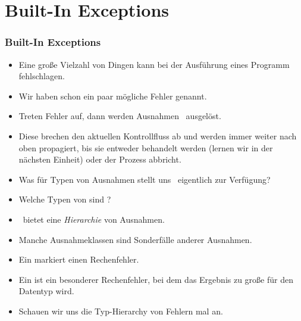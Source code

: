 \documentclass[aspectratio=169,mathserif,notheorems]{beamer}%
\begin{document}
\section{Built-In Exceptions}%
%
\begin{frame}%
\frametitle{Built-In Exceptions}%
\begin{itemize}%
\item Eine große Vielzahl von Dingen kann bei der Ausführung eines Programm fehlschlagen.%
%
\item<2-> Wir haben schon ein paar mögliche Fehler genannt.%
%
\item<3-> Treten Fehler auf, dann werden Ausnahmen~ ausgelöst.%
%
\item<4-> Diese brechen den aktuellen Kontrollfluss ab und werden immer weiter nach oben propagiert, bis sie entweder behandelt werden (lernen wir in der nächsten Einheit) oder der Prozess abbricht.%
\item<5-> Was für Typen von Ausnahmen stellt uns \python\ eigentlich zur Verfügung?%
%
\item<6-> Welche Typen von  sind ?%
%
\item<7-> \python\ bietet eine \emph{Hierarchie} von Ausnahmen.%
%
\item<8-> Manche Ausnahmeklassen sind Sonderfälle anderer Ausnahmen.%
%
\item<9-> Ein  markiert einen Rechenfehler.%
%
\item<10-> Ein  ist ein besonderer Rechenfehler, bei dem das Ergebnis zu große für den Datentyp wird.%
%
\item<11-> Schauen wir uns die Typ-Hierarchy von Fehlern mal an.%
\end{itemize}%
\end{frame}%
%
\end{document}

